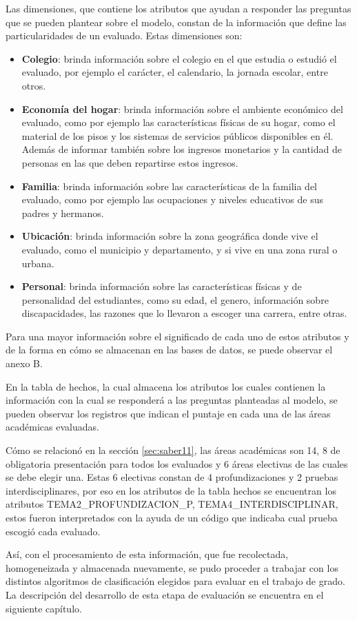 Las dimensiones, que contiene los atributos que ayudan a responder las preguntas que se pueden plantear sobre el modelo, constan de la información que define las particularidades de un evaluado. Estas dimensiones son: 
\begin{itemize}
\item \textbf{Colegio}: brinda información sobre el colegio en el que estudia o estudió el evaluado, por ejemplo el carácter, el calendario, la jornada escolar, entre otros.
\item \textbf{Economía del hogar}: brinda información sobre el ambiente económico del evaluado, como por ejemplo las características físicas de su hogar, como el material de los pisos y los sistemas de servicios públicos disponibles en él. Además de informar también sobre los ingresos monetarios y la cantidad de personas en las que deben repartirse estos ingresos.
\item \textbf{Familia}: brinda información sobre las características de la familia del evaluado, como por ejemplo las ocupaciones y niveles educativos de sus padres y hermanos.
\item \textbf{Ubicación}: brinda información sobre la zona geográfica donde vive el evaluado, como el municipio y departamento, y si vive en una zona rural o urbana.
\item \textbf{Personal}: brinda información sobre las características físicas y de personalidad del estudiantes, como su edad, el genero, información sobre discapacidades, las razones que lo llevaron a escoger una carrera, entre otras.
\end{itemize}
Para una mayor información sobre el significado de cada uno de estos atributos y de la forma en cómo se almacenan en las bases de datos, se puede observar el anexo B.

En la tabla de hechos, la cual almacena los atributos los cuales contienen la información con la cual se responderá  a las preguntas planteadas al modelo, se pueden observar los registros que indican el puntaje en cada una de las áreas académicas evaluadas. 

Cómo se relacionó en la sección \ref{sec:saber11}, las áreas académicas son 14, 8 de obligatoria presentación para todos los evaluados y 6 áreas electivas de las cuales se debe elegir una. Estas 6 electivas constan de 4 profundizaciones y 2 pruebas interdisciplinares, por eso en los atributos de la tabla hechos se encuentran los atributos  TEMA2_PROFUNDIZACION_P, TEMA4_INTERDISCIPLINAR, estos fueron interpretados con la ayuda de un código que indicaba cual prueba escogió cada evaluado.

Así, con el procesamiento de esta información, que fue recolectada, homogeneizada y almacenada nuevamente, se pudo proceder a trabajar con los distintos algoritmos de clasificación elegidos para evaluar en el trabajo de grado. La descripción del desarrollo de esta etapa de evaluación se encuentra en el siguiente capítulo.